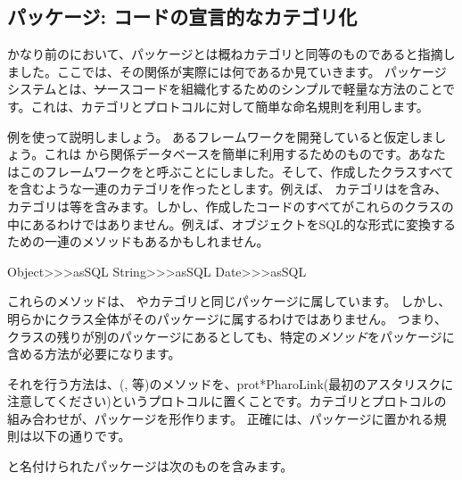 \documentclass[a4paper,10pt,twoside]{book}
\begin{document}
\subsection{パッケージ: \pharo コードの宣言的なカテゴリ化}

かなり前のにおいて、パッケージとは概ねカテゴリと同等のものであると指摘しました。ここでは、その関係が実際には何であるか見ていきます。
パッケージシステムとは、\st ソースコードを組織化するためのシンプルで軽量な方法のことです。これは、カテゴリとプロトコルに対して簡単な命名規則を利用します。

例を使って説明しましょう。
あるフレームワークを開発していると仮定しましょう。これは \pharo から関係データベースを簡単に利用するためのものです。あなたはこのフレームワークをと呼ぶことにしました。そして、作成したクラスすべてを含むような一連のカテゴリを作ったとします。例えば、
カテゴリはを含み、カテゴリは等を含みます。しかし、作成したコードのすべてがこれらのクラスの中にあるわけではありません。例えば、オブジェクトをSQL的な形式に変換するための一連のメソッドもあるかもしれません。

\begin{code}{}
Object>>>asSQL
String>>>asSQL
Date>>>asSQL
\end{code}

\noindent
これらのメソッドは、
やカテゴリと同じパッケージに属しています。
しかし、明らかにクラス全体がそのパッケージに属するわけではありません。
つまり、クラスの残りが別のパッケージにあるとしても、特定の\emph{メソッド}をパッケージに含める方法が必要になります。


それを行う方法は、(,  等)のメソッドを、prot{*PharoLink}(最初のアスタリスクに注意してください)というプロトコルに置くことです。カテゴリとプロトコルの組み合わせが、パッケージを形作ります。
正確には、パッケージに置かれる規則は以下の通りです。

と名付けられたパッケージは次のものを含みます。
\end{document}
